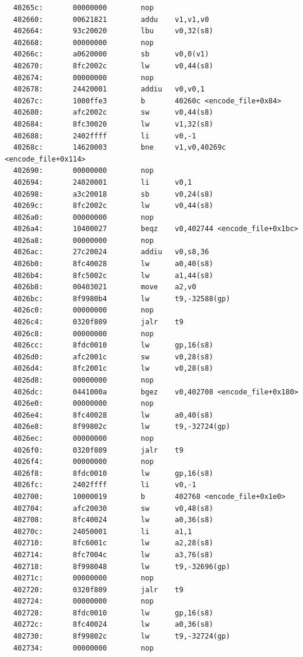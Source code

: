 \documentclass[11pt]{article}
\begin{document}
\begin{verbatim}
  40265c:       00000000        nop
  402660:       00621821        addu    v1,v1,v0
  402664:       93c20020        lbu     v0,32(s8)
  402668:       00000000        nop
  40266c:       a0620000        sb      v0,0(v1)
  402670:       8fc2002c        lw      v0,44(s8)
  402674:       00000000        nop
  402678:       24420001        addiu   v0,v0,1
  40267c:       1000ffe3        b       40260c <encode_file+0x84>
  402680:       afc2002c        sw      v0,44(s8)
  402684:       8fc30020        lw      v1,32(s8)
  402688:       2402ffff        li      v0,-1
  40268c:       14620003        bne     v1,v0,40269c <encode_file+0x114>
  402690:       00000000        nop
  402694:       24020001        li      v0,1
  402698:       a3c20018        sb      v0,24(s8)
  40269c:       8fc2002c        lw      v0,44(s8)
  4026a0:       00000000        nop
  4026a4:       10400027        beqz    v0,402744 <encode_file+0x1bc>
  4026a8:       00000000        nop
  4026ac:       27c20024        addiu   v0,s8,36
  4026b0:       8fc40028        lw      a0,40(s8)
  4026b4:       8fc5002c        lw      a1,44(s8)
  4026b8:       00403021        move    a2,v0
  4026bc:       8f9980b4        lw      t9,-32588(gp)
  4026c0:       00000000        nop
  4026c4:       0320f809        jalr    t9
  4026c8:       00000000        nop
  4026cc:       8fdc0010        lw      gp,16(s8)
  4026d0:       afc2001c        sw      v0,28(s8)
  4026d4:       8fc2001c        lw      v0,28(s8)
  4026d8:       00000000        nop
  4026dc:       0441000a        bgez    v0,402708 <encode_file+0x180>
  4026e0:       00000000        nop
  4026e4:       8fc40028        lw      a0,40(s8)
  4026e8:       8f99802c        lw      t9,-32724(gp)
  4026ec:       00000000        nop
  4026f0:       0320f809        jalr    t9
  4026f4:       00000000        nop
  4026f8:       8fdc0010        lw      gp,16(s8)
  4026fc:       2402ffff        li      v0,-1
  402700:       10000019        b       402768 <encode_file+0x1e0>
  402704:       afc20030        sw      v0,48(s8)
  402708:       8fc40024        lw      a0,36(s8)
  40270c:       24050001        li      a1,1
  402710:       8fc6001c        lw      a2,28(s8)
  402714:       8fc7004c        lw      a3,76(s8)
  402718:       8f998048        lw      t9,-32696(gp)
  40271c:       00000000        nop
  402720:       0320f809        jalr    t9
  402724:       00000000        nop
  402728:       8fdc0010        lw      gp,16(s8)
  40272c:       8fc40024        lw      a0,36(s8)
  402730:       8f99802c        lw      t9,-32724(gp)
  402734:       00000000        nop

\end{verbatim}
\end{document}
